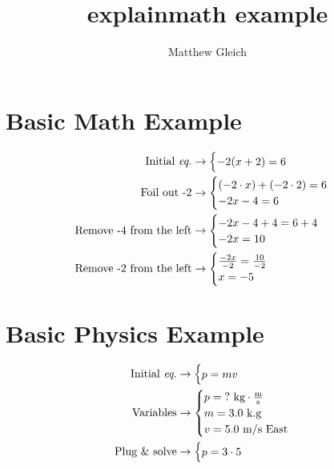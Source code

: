 \documentclass{report}
\title{explainmath example}
\author{Matthew Gleich}
\date{ }
\begin{document}
    \maketitle

    \section{Basic Math Example}
        \begin{align*}
            \textrm{Initial \textit{eq.}}&\rightarrow \begin{cases} -2(x + 2) = 6 \end{cases} \\
            \textrm{Foil out -2}&\rightarrow \begin{cases} 
                (-2 \cdot x) + (-2 \cdot 2) = 6 \\
                -2x - 4 = 6
             \end{cases} \\
            \textrm{Remove -4 from the left}&\rightarrow \begin{cases} 
                -2x - 4 + 4 = 6 + 4 \\
                -2x = 10
             \end{cases} \\
            \textrm{Remove -2 from the left}&\rightarrow \begin{cases} 
                \frac{-2x}{-2} = \frac{10}{-2} \\
                x = -5
             \end{cases} \\
        \end{align*}

    \section{Basic Physics Example}
        \begin{align*}
            \textrm{Initial \textit{eq.}}&\rightarrow \begin{cases} p = mv \end{cases} \\
            \textrm{Variables}&\rightarrow \begin{cases} 
                p = \textrm{?} \textrm{ kg} \cdot \frac{\textrm{m}}{\textrm{s}} \\
                m = 3.0 \textrm{ k.g} \\
                v = 5.0 \textrm{ m/s East}
             \end{cases} \\
            \textrm{Plug \& solve}&\rightarrow \begin{cases} p = 3 \cdot 5 \end{cases} \\
        \end{align*}
\end{document}
